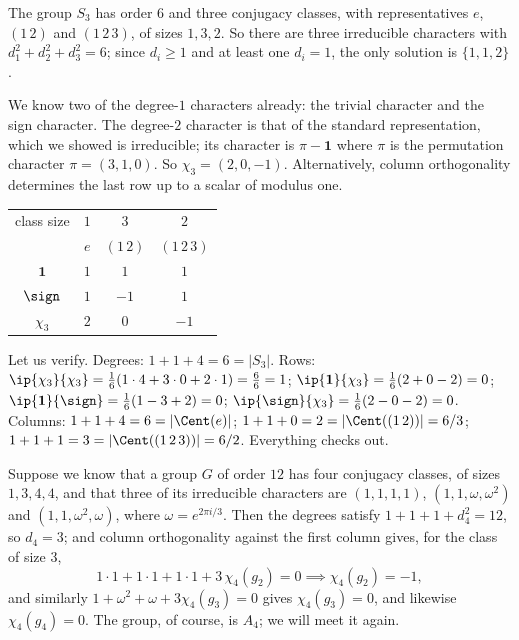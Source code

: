 \begin{example}[$S_3$]
	The group $S_3$ has order $6$ and three conjugacy classes, with representatives $e$, $(1\,2)$ and $(1\,2\,3)$, of sizes $1, 3, 2$. So there are three irreducible characters with $d_1^2 + d_2^2 + d_3^2 = 6$; since $d_i \geq 1$ and at least one $d_i = 1$, the only solution is $\{1,1,2\}$.

	We know two of the degree-$1$ characters already: the trivial character and the sign character. The degree-$2$ character is that of the standard representation, which we showed is irreducible; its character is $\pi - \mathbf 1$ where $\pi$ is the permutation character $\pi = (3,1,0)$. So $\chi_3 = (2, 0, -1)$. Alternatively, column orthogonality determines the last row up to a scalar of modulus one.
	\begin{center}
	\renewcommand{\arraystretch}{1.25}
	\setlength{\tabcolsep}{10pt}
	\begin{tabular}{c|ccc}
	\toprule
	class size & $1$ & $3$ & $2$\\
	 & $e$ & $(1\,2)$ & $(1\,2\,3)$\\
	\midrule
	$\mathbf 1$ & $1$ & $1$ & $1$\\
	$\sign$ & $1$ & $-1$ & $1$\\
	$\chi_3$ & $2$ & $0$ & $-1$\\
	\bottomrule
	\end{tabular}
	\end{center}
	Let us verify. Degrees: $1 + 1 + 4 = 6 = |S_3|$. Rows: $\ip{\chi_3}{\chi_3} = \frac16(1\cdot 4 + 3\cdot 0 + 2\cdot 1) = \frac{6}{6} = 1$; $\ip{\mathbf1}{\chi_3} = \frac16(2 + 0 - 2) = 0$; $\ip{\mathbf1}{\sign} = \frac16(1 - 3 + 2) = 0$; $\ip{\sign}{\chi_3} = \frac16(2 - 0 - 2) = 0$. Columns: $1 + 1 + 4 = 6 = |\Cent(e)|$; $1 + 1 + 0 = 2 = |\Cent((1\,2))| = 6/3$; $1+1+1 = 3 = |\Cent((1\,2\,3))| = 6/2$. Everything checks out.
\end{example}

\begin{example}
	Suppose we know that a group $G$ of order $12$ has four conjugacy classes, of sizes $1,3,4,4$, and that three of its irreducible characters are $(1,1,1,1)$, $(1,1,\omega,\omega^2)$ and $(1,1,\omega^2,\omega)$, where $\omega = e^{2\pi i/3}$. Then the degrees satisfy $1+1+1+d_4^2 = 12$, so $d_4 = 3$; and column orthogonality against the first column gives, for the class of size $3$,
	$$1\cdot 1 + 1\cdot 1 + 1\cdot 1 + 3\,\chi_4(g_2) = 0 \implies \chi_4(g_2) = -1,$$
	and similarly $1 + \omega^2 + \omega + 3\chi_4(g_3) = 0$ gives $\chi_4(g_3) = 0$, and likewise $\chi_4(g_4) = 0$. The group, of course, is $A_4$; we will meet it again.
\end{example}

